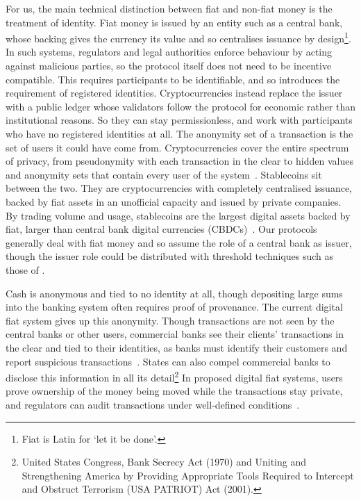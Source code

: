 For us, the main technical distinction between fiat and non-fiat money is the
treatment of identity. Fiat money is issued by an entity such as a
central bank, whose backing gives the currency its value and so centralises
issuance by design\footnote{Fiat is Latin for `let it be done'.}. In such
systems, regulators and legal authorities enforce behaviour by acting against
malicious parties, so the protocol itself does not need to be incentive
compatible. This requires participants to be identifiable, and so introduces the
requirement of registered identities. Cryptocurrencies instead replace the
issuer with a public ledger whose validators follow the protocol for economic
rather than institutional reasons. So they can stay permissionless, and work
with participants who have no registered identities at all. The anonymity set of a transaction is the set of users it could have come
from. Cryptocurrencies cover the entire spectrum of privacy, from pseudonymity with each
transaction in the clear to hidden values and anonymity sets that contain every
user of the system~\cite{bitcoin,ethereum,EPRINT:Noether15,SP:BCGGMT14}. Stablecoins sit
between the two. They are cryptocurrencies with completely centralised issuance, backed
by fiat assets in an unofficial capacity and issued by private companies. By
trading volume and usage, stablecoins are the largest digital assets backed by
fiat, larger than central bank digital currencies
(CBDCs)~\cite{BIS26stablecoins}. Our protocols generally deal with fiat money and
so assume the role of a central bank as issuer, though the issuer role could be
distributed with threshold techniques such as those of .

Cash is anonymous and tied to no identity at all, though depositing large sums
into the banking system often requires proof of provenance. The current digital
fiat system gives up this anonymity. Though transactions are not seen by the
central banks or other users, commercial banks see their clients' transactions
in the clear and tied to their identities, as banks must identify their
customers and report suspicious transactions~\cite{fatf2012recommendations}. States can also compel commercial
banks to disclose this information in all its detail\footnote{United States
Congress, Bank Secrecy Act (1970) and Uniting and Strengthening America by
Providing Appropriate Tools Required to Intercept and Obstruct Terrorism (USA
PATRIOT) Act (2001).}  In proposed digital fiat systems, users prove ownership
of the money being moved while the transactions stay private, and regulators
can audit transactions under well-defined conditions~\cite{digitaleuro2023}.

